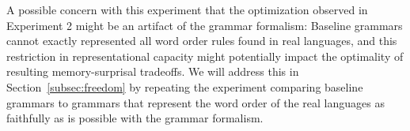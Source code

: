 


A possible concern with this experiment that the optimization observed in Experiment 2 might be an artifact of the grammar formalism:
Baseline grammars cannot exactly represented all word order rules found in real languages, and this restriction in representational capacity might potentially impact the optimality of resulting memory-surprisal tradeoffs.
We will address this in Section~\ref{subsec:freedom} by repeating the experiment comparing baseline grammars to grammars that represent the word order of the real languages as faithfully as is possible with the grammar formalism.


